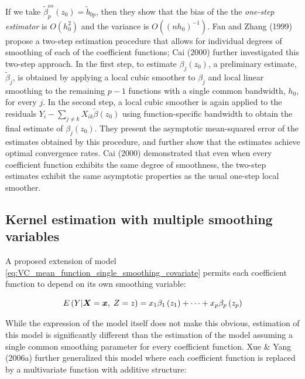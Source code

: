 \documentclass[12pt]{article}
\newcommand{\bfx}{\mbox{\boldmath $x$}}
\newcommand{\bfX}{\mbox{\boldmath $X$}}
\begin{document}
If we take $\tilde{\beta}^{os}_p\left(z_0\right) = \tilde{b}_{0p}$, then they show that the bias of the the \textit{one-step estimator} is $O\left(h_0^2\right)$ and the variance is $O\left( \left(nh_0 \right)^{-1} \right)$. Fan and Zhang (1999) propose a two-step estimation procedure that allows for individual degrees of smoothing of each of the coefficient functions; Cai (2000) further investigated this two-step approach. In the first step, to estimate $\beta_j\left(z_0\right)$, a preliminary estimate, $\tilde{\beta}_j$, is obtained by applying a local cubic smoother to $\beta_j$ and local linear smoothing to the remaining $p-1$ functions with a single common bandwidth, $h_0$, for every $j$. In the second step, a local cubic smoother is again applied to the residuals $Y_i-\sum_{j\ne k} X_{ik} \tilde{\beta}\left( z_0 \right)$ using function-specific bandwidth to obtain the final estimate of $\beta_j\left(z_0\right)$. They present the asymptotic mean-squared error of the estimates obtained by this procedure, and further show  that the estimates achieve optimal convergence rates. Cai (2000) demonstrated that even when every coefficient function exhibits the same degree of smoothness, the two-step estimates exhibit the same asymptotic properties as the usual one-step local smoother.  

\subsection{Kernel estimation with multiple smoothing variables}

A proposed extension of model \ref{eq:VC_mean_function_single_smoothing_covariate} permits each coefficient function to depend on its own smoothing variable: 

\begin{equation} \nonumber
E\left(Y \vert \bfX=\bfx,\;Z = z \right) = x_1\beta_1\left(z_1\right) + \dots  + x_p\beta_p\left(z_p\right)
\end{equation}

While the expression of the model itself does not make this obvious, estimation of this model is significantly different than the estimation of the model assuming a single common smoothing parameter for every coefficient function. Xue \& Yang (2006a) further generalized this model where each coefficient function is replaced by a multivariate function with additive structure:
\end{document}
